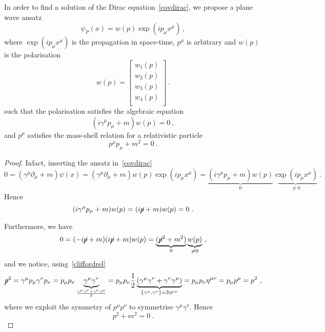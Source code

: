     In order to find a solution of the Dirac equation~\eqref{covdirac}, we propose a plane wave ansatz 
    \begin{equation*}
        \psi_P(x) = w (p) \exp(i p_\mu x^\mu) ~,
    \end{equation*}
    where $\exp(i p_\mu x^\mu)$ is the propagation in space-time, $p^\mu$ is arbitrary and $w(p)$ is the polarisation 
    \begin{equation*}
        w(p) = \begin{bmatrix}
            w_1(p) \\ w_2(p) \\ w_3(p) \\ w_4(p) \\
        \end{bmatrix} ~.
    \end{equation*}
    such that the polarisation satisfies the algebraic equation 
    \begin{equation}\label{pol}
        (i \gamma^\mu p_\mu + m ) w(p) = 0 ~,
    \end{equation}
    and $p^\mu$ satisfies the mass-shell relation for a relativistic particle
    \begin{equation*}
        p^\mu p_\mu + m^2 = 0~.
    \end{equation*}
    \begin{proof}
        Infact, inserting the ansatz in~\eqref{covdirac}
        \begin{equation*}
            0 = (\gamma^\mu \partial_\mu + m) \psi(x) = (\gamma^\mu \partial_\mu + m) w(p) \exp(i p_\mu x^\mu) = \underbrace{(i \gamma^\mu p_\mu + m) w(p)}_0 \underbrace{\exp(i p_\mu x^\mu)}_{\neq 0} ~.
        \end{equation*}
        Hence
        \begin{equation*}
            (i \gamma^\mu p_\mu + m) w(p) = (i \cancel p + m) w(p) = 0 ~.
        \end{equation*}

        Furthermore, we have 
        \begin{equation*}
            0 = (- i \cancel p + m)(i \cancel p + m) w(p) = \underbrace{(\cancel p^2 + m^2)}_0 \underbrace{w(p)}_{\neq 0} ~,
        \end{equation*}
        and we notice, using~\eqref{cliffordrel}
        \begin{equation*}
            \cancel p^2 = \gamma^\mu p_\mu \gamma^\nu p_\nu = p_\mu p_\nu \underbrace{\gamma^\mu \gamma^\nu}_{\frac{\gamma^\mu \gamma^\nu + \gamma^\nu \gamma^\mu}{2}} = p_\mu p_\nu \frac{1}{2} \underbrace{(\gamma^\mu \gamma^\nu + \gamma^\nu \gamma^\mu)}_{\{\gamma^\mu, \gamma^\nu\} = 2 \eta^{\mu\nu}}= p_\mu p_\nu \eta^{\mu\nu} = p_\mu p^\mu = p^2 ~,
        \end{equation*}
        where we exploit the symmetry of $p^\mu p^\nu$ to symmetrise $\gamma^\mu \gamma^\nu$. Hence
        \begin{equation*}
            p^2 + m^2 = 0 ~.
        \end{equation*}
    \end{proof}

